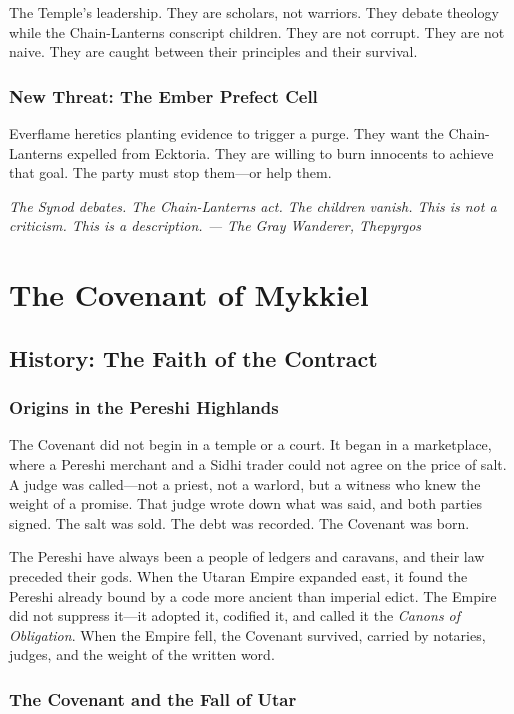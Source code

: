 \documentclass{book}
\newcommand{\citation}[1]{\textcolor{marginalia}{\small\textit{#1}}}
\begin{document}
The Temple's leadership. They are scholars, not warriors. They debate theology while the Chain-Lanterns conscript children. They are not corrupt. They are not naive. They are caught between their principles and their survival.

\section{New Threat: The Ember Prefect Cell}

Everflame heretics planting evidence to trigger a purge. They want the Chain-Lanterns expelled from Ecktoria. They are willing to burn innocents to achieve that goal. The party must stop them---or help them.

\citation{The Synod debates. The Chain-Lanterns act. The children vanish. This is not a criticism. This is a description. --- The Gray Wanderer, Thepyrgos}

\part{The Covenant of Mykkiel}

\chapter{History: The Faith of the Contract}

\section{Origins in the Pereshi Highlands}

The Covenant did not begin in a temple or a court. It began in a marketplace, where a Pereshi merchant and a Sidhi trader could not agree on the price of salt. A judge was called---not a priest, not a warlord, but a witness who knew the weight of a promise. That judge wrote down what was said, and both parties signed. The salt was sold. The debt was recorded. The Covenant was born.

The Pereshi have always been a people of ledgers and caravans, and their law preceded their gods. When the Utaran Empire expanded east, it found the Pereshi already bound by a code more ancient than imperial edict. The Empire did not suppress it---it adopted it, codified it, and called it the \textit{Canons of Obligation}. When the Empire fell, the Covenant survived, carried by notaries, judges, and the weight of the written word.

\section{The Covenant and the Fall of Utar}
\end{document}
